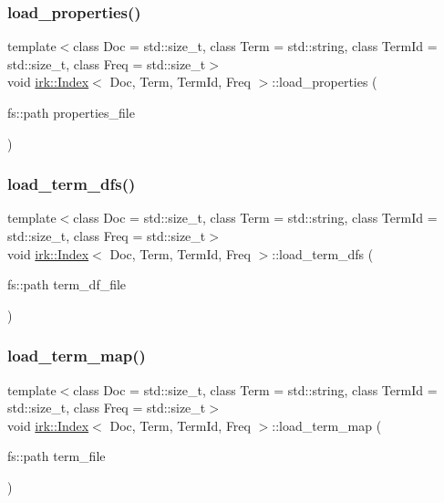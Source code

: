 \subsubsection{\texorpdfstring{load\+\_\+properties()}{load\_properties()}}
{\footnotesize\ttfamily template$<$class Doc  = std\+::size\+\_\+t, class Term  = std\+::string, class Term\+Id  = std\+::size\+\_\+t, class Freq  = std\+::size\+\_\+t$>$ \\
void \mbox{\hyperlink{classirk_1_1Index}{irk\+::\+Index}}$<$ Doc, Term, Term\+Id, Freq $>$\+::load\+\_\+properties (\begin{DoxyParamCaption}\item[{fs\+::path}]{properties\+\_\+file }\end{DoxyParamCaption})\hspace{0.3cm}{\ttfamily [inline]}}

\mbox{\label{classirk_1_1Index_ae3a25d8b3bba2191ad2010317e83ebae}} 
\subsubsection{\texorpdfstring{load\+\_\+term\+\_\+dfs()}{load\_term\_dfs()}}
{\footnotesize\ttfamily template$<$class Doc  = std\+::size\+\_\+t, class Term  = std\+::string, class Term\+Id  = std\+::size\+\_\+t, class Freq  = std\+::size\+\_\+t$>$ \\
void \mbox{\hyperlink{classirk_1_1Index}{irk\+::\+Index}}$<$ Doc, Term, Term\+Id, Freq $>$\+::load\+\_\+term\+\_\+dfs (\begin{DoxyParamCaption}\item[{fs\+::path}]{term\+\_\+df\+\_\+file }\end{DoxyParamCaption})\hspace{0.3cm}{\ttfamily [inline]}}

\mbox{\label{classirk_1_1Index_a0fe8e303bff128d44979a2d2424fbfd0}} 
\subsubsection{\texorpdfstring{load\+\_\+term\+\_\+map()}{load\_term\_map()}}
{\footnotesize\ttfamily template$<$class Doc  = std\+::size\+\_\+t, class Term  = std\+::string, class Term\+Id  = std\+::size\+\_\+t, class Freq  = std\+::size\+\_\+t$>$ \\
void \mbox{\hyperlink{classirk_1_1Index}{irk\+::\+Index}}$<$ Doc, Term, Term\+Id, Freq $>$\+::load\+\_\+term\+\_\+map (\begin{DoxyParamCaption}\item[{fs\+::path}]{term\+\_\+file }\end{DoxyParamCaption})\hspace{0.3cm}{\ttfamily [inline]}}


